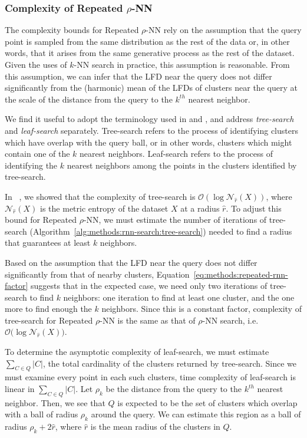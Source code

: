 \subsubsection{Complexity of Repeated \texorpdfstring{$\rho$}{p}-NN}
\label{sec:methods:knn-search:repeated-rnn-complexity}

The complexity bounds for Repeated $\rho$-NN rely on the assumption that the query point is sampled from the same distribution as the rest of the data or, in other words, that it arises from the same generative process as the rest of the dataset.
Given the uses of $k$-NN search in practice, this assumption is reasonable.
From this assumption, we can infer that the LFD near the query does not differ significantly from the (harmonic) mean of the LFDs of clusters near the query at the scale of the distance from the query to the $k^{th}$ nearest neighbor.

We find it useful to adopt the terminology used in \cite{ishaq2019clustered} and \cite{yu2015entropy}, and address \textit{tree-search} and \textit{leaf-search} separately.
Tree-search refers to the process of identifying clusters which have overlap with the query ball, or in other words, clusters which might contain one of the $k$ nearest neighbors.
Leaf-search refers to the process of identifying the $k$ nearest neighbors among the points in the clusters identified by tree-search.

In ~\cite{ishaq2019clustered}, we showed that the complexity of tree-search is $\mathcal{O}(\log\mathcal{N}_{\hat{r}}(X))$, where $\mathcal{N}_{\hat{r}}(X)$ is the metric entropy of the dataset $X$ at a radius $\hat{r}$.
To adjust this bound for Repeated $\rho$-NN, we must estimate the number of iterations of tree-search (Algorithm~\ref{alg:methods:rnn-search:tree-search}) needed to find a radius that guarantees at least $k$ neighbors.

Based on the assumption that the LFD near the query does not differ significantly from that of nearby clusters, Equation~\ref{eq:methods:repeated-rnn-factor} suggests that in the expected case, we need only two iterations of tree-search to find $k$ neighbors:
one iteration to find at least one cluster, and the one more to find enough the $k$ neighbors.
Since this is a constant factor, complexity of tree-search for Repeated $\rho$-NN is the same as that of $\rho$-NN search, i.e. $\mathcal{O}\big(\log\mathcal{N}_{\hat{r}}(X)\big)$.

To determine the asymptotic complexity of leaf-search, we must estimate $\sum_{C \in Q} |C|$, the total cardinality of the clusters returned by tree-search.
Since we must examine every point in each such clusters, time complexity of leaf-search is linear in $\sum_{C \in Q} |C|$.
Let $\rho_k$ be the distance from the query to the $k^{th}$ nearest neighbor.
Then, we see that $Q$ is expected to be the set of clusters which overlap with a ball of radius $\rho_k$ around the query.
We can estimate this region as a ball of radius $\rho_k + 2\hat{r}$, where $\hat{r}$ is the mean radius of the clusters in $Q$.

